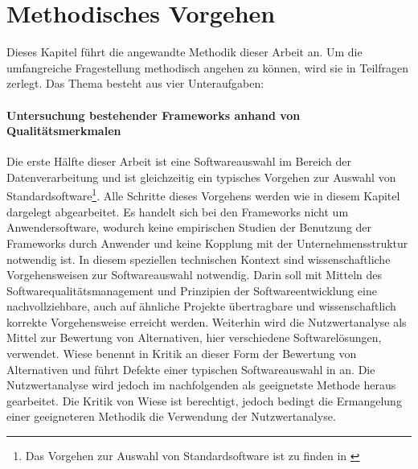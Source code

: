 \chapter{Methodisches Vorgehen}
\label{chapter:methodik}

Dieses Kapitel führt die angewandte Methodik dieser Arbeit an.
Um die umfangreiche Fragestellung methodisch angehen zu können, wird sie in Teilfragen zerlegt.
Das Thema \glqq{}\titel{}\grqq{} besteht aus vier Unteraufgaben:

\subsubsection{Untersuchung bestehender Frameworks anhand von Qualitätsmerkmalen}
Die erste Hälfte dieser Arbeit ist eine Softwareauswahl im Bereich der Datenverarbeitung und ist gleichzeitig ein typisches Vorgehen zur Auswahl von Standardsoftware\footnote{Das Vorgehen zur Auswahl von Standardsoftware ist zu finden in \cite[S.4]{book:softwareauswahl}}.
Alle Schritte dieses Vorgehens werden wie in diesem Kapitel dargelegt abgearbeitet.
Es handelt sich bei den Frameworks nicht um Anwendersoftware, wodurch keine empirischen Studien der Benutzung der Frameworks durch Anwender und keine Kopplung mit der Unternehmensstruktur notwendig ist.
In diesem speziellen technischen Kontext sind wissenschaftliche Vorgehensweisen zur Softwareauswahl notwendig.
Darin soll mit Mitteln des Softwarequalitätsmanagement und Prinzipien der Softwareentwicklung eine nachvollziehbare, auch auf ähnliche Projekte übertragbare und wissenschaftlich korrekte Vorgehensweise erreicht werden.
Weiterhin wird die Nutzwertanalyse als Mittel zur Bewertung von Alternativen, hier verschiedene Softwarelösungen, verwendet.
Wiese benennt in \cite[S.5 ff.]{book:softwareauswahl} Kritik an dieser Form der Bewertung von Alternativen und führt Defekte einer typischen Softwareauswahl in \cite[S.12 ff.]{book:softwareauswahl} an.
Die Nutzwertanalyse wird jedoch im nachfolgenden als geeignetste Methode heraus gearbeitet.
Die Kritik von Wiese ist berechtigt, jedoch bedingt die Ermangelung einer geeigneteren Methodik die Verwendung der Nutzwertanalyse.

